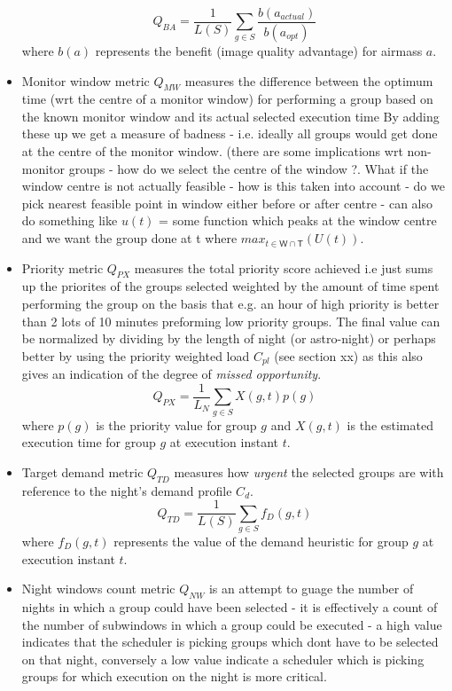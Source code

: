\begin{itemize}
\begin{equation}
Q_{BA} = \frac{1}{L(S)}\sum_{g \in S}{\frac{b(a_{actual})}{b(a_{opt})}}
\end{equation}
where $b(a)$ represents the benefit (image quality advantage) for airmass $a$.

\item Monitor window metric $Q_{MW}$ measures the difference between the optimum time (wrt the centre of a monitor window) for performing a group based on the known monitor window and its actual selected execution time By adding these up we get a measure of badness - i.e. ideally all groups would get done at the centre of the monitor window. (there are some implications wrt non-monitor groups - how do we select the centre of the window ?. What if the window centre is not actually feasible - how is this taken into account  - do we pick nearest feasible point in window either before or after centre  - can also do something like $u(t)$ = some function which peaks at the window centre and we want the group done at t where $max_{t \in \textsf{W} \cap \textsf{T}}(U(t))$.   

\item Priority metric $Q_{PX}$ measures the total priority score achieved i.e just sums up the priorites of the groups selected weighted by the amount of time spent performing the group on the basis that e.g. an hour of high priority is better than 2 lots of 10 minutes preforming low priority groups. The final value can be normalized by dividing by the length of night (or astro-night) or perhaps better by using the priority weighted load $C_{pl}$ (see section xx) as this also gives an indication of the degree of \emph{missed opportunity}.
\begin{equation}
Q_{PX} = \frac{1}{L_N}\sum_{g \in S}{X(g,t)p(g)}
\end{equation}
where $p(g)$ is the priority value for group $g$ and $X(g,t)$ is the estimated execution time for group $g$ at execution instant $t$.

\item Target demand metric $Q_{TD}$ measures how \emph{urgent} the selected groups are with reference to the night's demand profile $C_d$.
\begin{equation}
Q_{TD} = \frac{1}{L(S)}\sum_{g \in S}{f_D(g,t)}
\end{equation}
where $f_D(g,t)$ represents the value of the demand heuristic for group $g$ at execution instant $t$.

\item Night windows count metric $Q_{NW}$ is an attempt to guage the number of nights in which a group could have been selected - it is effectively a count of the number of subwindows in which a group could be executed - a high value indicates that the scheduler is picking groups which dont have to be selected on that night, conversely a low value indicate a scheduler which is picking groups for which execution on the night is more critical. 


\end{itemize}

